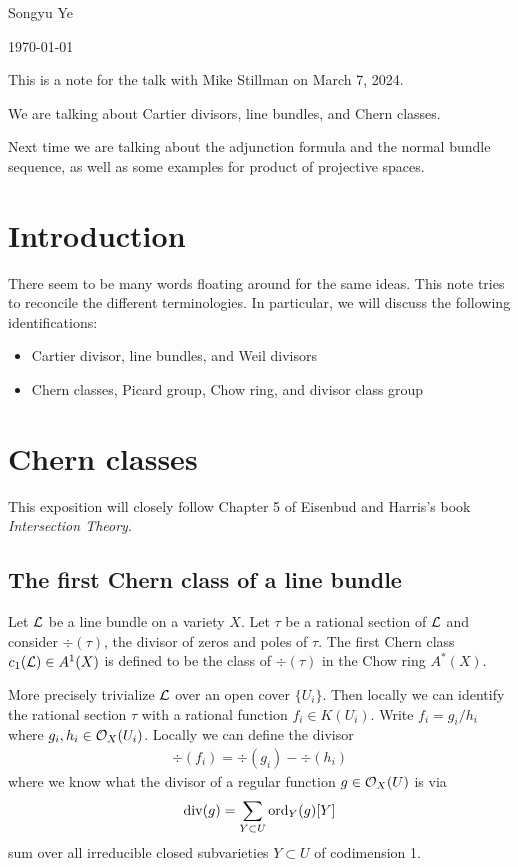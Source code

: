 \documentclass[12pt]{article}
\begin{document}
Songyu Ye

\today

\hfill

This is a note for the talk with Mike Stillman on March 7, 2024.

We are talking about Cartier divisors, line bundles, and Chern classes.

Next time we are talking about the adjunction formula and the normal bundle sequence, as well
as some examples for product of projective spaces.
\section{Introduction}
There seem to be many words floating around for the same ideas. This note tries to 
reconcile the different terminologies. In particular, we will discuss the following identifications:
\begin{itemize}
    \item Cartier divisor, line bundles, and Weil divisors
    \item Chern classes, Picard group, Chow ring, and divisor class group
\end{itemize}

\section{Chern classes}
This exposition will closely follow Chapter 5 of Eisenbud and Harris's book \textit{Intersection Theory}.
\subsection{The first Chern class of a line bundle}
\begin{definition}
    Let ${\mathcal{L}}$ be a line bundle on a variety $X$. Let $\tau$ be a rational section of ${\mathcal{L}}$ and 
    consider $\div(\tau)$, the divisor of zeros and poles of $\tau$.
    The first Chern class $c_1({\mathcal{L}})\in A^1(X)$ is defined to be the class of $\div(\tau)$ in the Chow ring $A^*(X)$.
\end{definition}

More precisely trivialize ${\mathcal{L}}$ over an open cover $\{U_i\}$. Then locally we can identify the rational section
$\tau$ with a rational function $f_i \in K(U_i)$. Write $f_i = g_i/h_i$ where 
$g_i,h_i \in {\mathcal{O}}_X(U_i)$. Locally we can define the divisor \begin{align*}
    \div(f_i) = \div(g_i) - \div(h_i)
\end{align*}
where we know what the divisor of a regular function $g\in {\mathcal{O}}_X(U)$ is via \begin{align*}
    \mathrm{div}(g) = \sum_{Y\subset U} \operatorname{ord}_Y(g) [Y]
\end{align*} sum over all irreducible closed subvarieties $Y\subset U$ of codimension 1.
\end{document}
